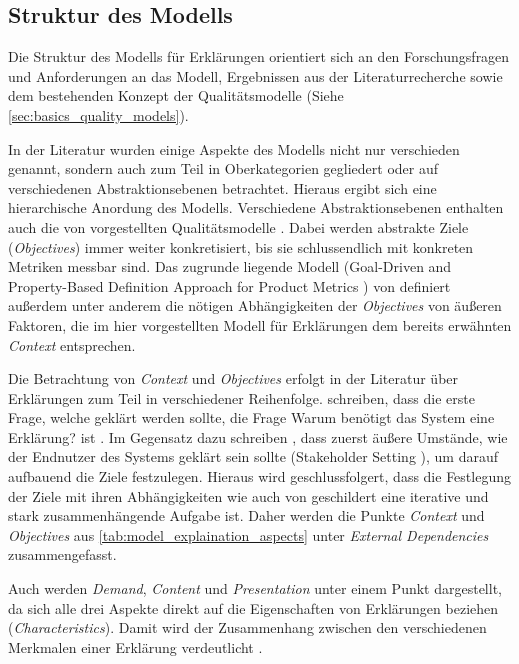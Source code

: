 \subsection{Struktur des Modells}

Die Struktur des Modells für Erklärungen orientiert sich an den Forschungsfragen und Anforderungen an das Modell, Ergebnissen aus der Literaturrecherche sowie dem bestehenden Konzept der Qualitätsmodelle \cite{schneider2012abenteuer} (Siehe \autoref{sec:basics_quality_models}).

In der Literatur wurden einige Aspekte des Modells nicht nur verschieden genannt, sondern auch zum Teil in Oberkategorien gegliedert oder auf verschiedenen Abstraktionsebenen betrachtet. Hieraus ergibt sich eine hierarchische Anordung des Modells. Verschiedene Abstraktionsebenen enthalten auch die von \citeauthor{schneider2012abenteuer} vorgestellten Qualitätsmodelle \cite{schneider2012abenteuer}. Dabei werden abstrakte Ziele (\textit{Objectives}) immer weiter konkretisiert, bis sie schlussendlich mit konkreten Metriken messbar sind. Das zugrunde liegende Modell (\glqq Goal-Driven and Property-Based Definition Approach for Product Metrics\grqq{} \cite{briand1995goal}) von \citeauthor{briand1995goal} definiert außerdem unter anderem die nötigen Abhängigkeiten der \textit{Objectives} von äußeren Faktoren, die im hier vorgestellten Modell für Erklärungen dem bereits erwähnten \textit{Context} entsprechen.

Die Betrachtung von \textit{Context} und \textit{Objectives} erfolgt in der Literatur über Erklärungen zum Teil in verschiedener Reihenfolge. \citeauthor{rosenfeld_explainability_2019} schreiben, dass die erste Frage, welche geklärt werden sollte, die Frage \glqq Warum benötigt das System eine Erklärung?\grqq{} ist \cite[vgl. S. 699][]{rosenfeld_explainability_2019}\cite{nunes_systematic_2017}. Im Gegensatz dazu schreiben \citeauthor{cirqueira_scenario-based_2020}, dass zuerst äußere Umstände, wie der Endnutzer des Systems geklärt sein sollte (\glqq Stakeholder Setting\grqq{} \cite{cirqueira_scenario-based_2020}), um darauf aufbauend die Ziele festzulegen. Hieraus wird geschlussfolgert, dass die Festlegung der Ziele mit ihren Abhängigkeiten wie auch von \cite{schneider2012abenteuer} geschildert eine iterative und stark zusammenhängende Aufgabe ist. Daher werden die Punkte \textit{Context} und \textit{Objectives} aus \autoref{tab:model_explaination_aspects} unter \textit{External Dependencies} zusammengefasst.

Auch werden \textit{Demand}, \textit{Content} und \textit{Presentation} unter einem Punkt dargestellt, da sich alle drei Aspekte direkt auf die Eigenschaften von Erklärungen beziehen (\textit{Characteristics}). Damit wird der Zusammenhang zwischen den verschiedenen Merkmalen einer Erklärung verdeutlicht \cite{nunes_systematic_2017}.

